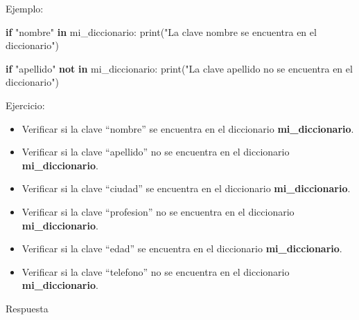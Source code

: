 \documentclass[
  a4paper,
  DIV=11,
  numbers=noendperiod,
  onepage,
  openany]{scrreprt}
\newenvironment{Shaded}{\begin{snugshade}}{\end{snugshade}}
\newcommand{\BuiltInTok}[1]{\textcolor[rgb]{0.00,0.23,0.31}{#1}}
\newcommand{\ControlFlowTok}[1]{\textcolor[rgb]{0.00,0.23,0.31}{\textbf{#1}}}
\newcommand{\KeywordTok}[1]{\textcolor[rgb]{0.00,0.23,0.31}{\textbf{#1}}}
\newcommand{\NormalTok}[1]{\textcolor[rgb]{0.00,0.23,0.31}{#1}}
\newcommand{\StringTok}[1]{\textcolor[rgb]{0.13,0.47,0.30}{#1}}
\providecommand{\tightlist}{%
  \setlength{\itemsep}{0pt}\setlength{\parskip}{0pt}}\usepackage{longtable,booktabs,array}
\begin{document}
Ejemplo:

\begin{Shaded}
\begin{Highlighting}[]
\ControlFlowTok{if} \StringTok{"nombre"} \KeywordTok{in}\NormalTok{ mi\_diccionario:}
    \BuiltInTok{print}\NormalTok{(}\StringTok{"La clave \textquotesingle{}nombre\textquotesingle{} se encuentra en el diccionario"}\NormalTok{)}

\ControlFlowTok{if} \StringTok{"apellido"} \KeywordTok{not} \KeywordTok{in}\NormalTok{ mi\_diccionario:}
    \BuiltInTok{print}\NormalTok{(}\StringTok{"La clave \textquotesingle{}apellido\textquotesingle{} no se encuentra en el diccionario"}\NormalTok{)}
\end{Highlighting}
\end{Shaded}

Ejercicio:

\begin{itemize}
\tightlist
\item
  Verificar si la clave ``nombre'' se encuentra en el diccionario
  \textbf{mi\_diccionario}.
\item
  Verificar si la clave ``apellido'' no se encuentra en el diccionario
  \textbf{mi\_diccionario}.
\item
  Verificar si la clave ``ciudad'' se encuentra en el diccionario
  \textbf{mi\_diccionario}.
\item
  Verificar si la clave ``profesion'' no se encuentra en el diccionario
  \textbf{mi\_diccionario}.
\item
  Verificar si la clave ``edad'' se encuentra en el diccionario
  \textbf{mi\_diccionario}.
\item
  Verificar si la clave ``telefono'' no se encuentra en el diccionario
  \textbf{mi\_diccionario}.
\end{itemize}

Respuesta
\end{document}
